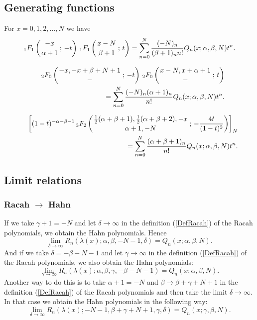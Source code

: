 \documentclass[envcountchap,graybox]{svmono}
\newcommand{\hyp}[5]{\mbox{}_{#1}{F}_{#2}
\left(\genfrac{}{}{0pt}{}{#3}{#4}\,;\,#5\right)}
\begin{document}
\subsection*{Generating functions}
For $x=0,1,2,\ldots,N$ we have
\begin{equation}
\label{GenHahn1}
\hyp{1}{1}{-x}{\alpha+1}{-t}\,\hyp{1}{1}{x-N}{\beta+1}{t}
=\sum_{n=0}^N\frac{(-N)_n}{(\beta+1)_nn!}Q_n(x;\alpha,\beta,N)t^n.
\end{equation}

\begin{eqnarray}
\label{GenHahn2}
& &\hyp{2}{0}{-x,-x+\beta+N+1}{-}{-t}\,\hyp{2}{0}{x-N,x+\alpha+1}{-}{t}\nonumber\\
& &{}=\sum_{n=0}^N\frac{(-N)_n(\alpha+1)_n}{n!}Q_n(x;\alpha,\beta,N)t^n.
\end{eqnarray}

\begin{eqnarray}
\label{GenHahn3}
& &\left[(1-t)^{-\alpha-\beta-1}\,\hyp{3}{2}{\frac{1}{2}(\alpha+\beta+1),\frac{1}{2}(\alpha+\beta+2),-x}
{\alpha+1,-N}{-\frac{4t}{(1-t)^2}}\right]_N\nonumber\\
& &{}=\sum_{n=0}^N\frac{(\alpha+\beta+1)_n}{n!}Q_n(x;\alpha,\beta,N)t^n.
\end{eqnarray}

\subsection*{Limit relations}

\subsubsection*{Racah $\rightarrow$ Hahn}
If we take $\gamma+1=-N$ and let $\delta\rightarrow\infty$ in the definition (\ref{DefRacah})
of the Racah polynomials, we obtain the Hahn polynomials. Hence
$$\lim_{\delta\rightarrow\infty}
R_n(\lambda(x);\alpha,\beta,-N-1,\delta)=Q_n(x;\alpha,\beta,N).$$
And if we take $\delta=-\beta-N-1$ and let $\gamma\rightarrow\infty$ in the definition (\ref{DefRacah})
of the Racah polynomials, we also obtain the Hahn polynomials:
$$\lim_{\gamma\rightarrow\infty}
R_n(\lambda(x);\alpha,\beta,\gamma,-\beta-N-1)=Q_n(x;\alpha,\beta,N).$$
Another way to do this is to take $\alpha+1=-N$ and $\beta\rightarrow\beta+\gamma+N+1$ in
the definition (\ref{DefRacah}) of the Racah polynomials and then take the limit
$\delta\rightarrow\infty$. In that case we obtain the Hahn polynomials in the following way:
$$\lim_{\delta\rightarrow\infty}
R_n(\lambda(x);-N-1,\beta+\gamma+N+1,\gamma,\delta)=Q_n(x;\gamma,\beta,N).$$
\end{document}
